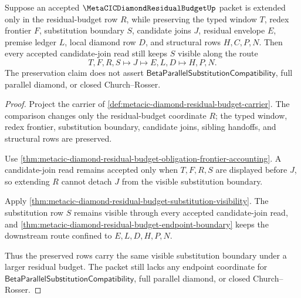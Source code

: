 \begin{theorem}
\label{thm:metacic-diamond-residual-budget-substitution-preservation}
Suppose an accepted $\MetaCICDiamondResidualBudgetUp$ packet is extended only in the residual-budget row $R$, while preserving the typed window $T$, redex frontier $F$, substitution boundary $S$, candidate joins $J$, residual envelope $E$, premise ledger $L$, local diamond row $D$, and structural rows $H,C,P,N$. Then every accepted candidate-join read still keeps $S$ visible along the route
$$
T,F,R,S \longmapsto J \longmapsto E,L,D \longmapsto H,P,N .
$$
The preservation claim does not assert $\mathsf{BetaParallelSubstitutionCompatibility}$, full parallel diamond, or closed Church--Rosser.
\end{theorem}
\begin{proof}
Project the carrier of \autoref{def:metacic-diamond-residual-budget-carrier}. The comparison changes only the residual-budget coordinate $R$; the typed window, redex frontier, substitution boundary, candidate joins, sibling handoffs, and structural rows are preserved.

Use \autoref{thm:metacic-diamond-residual-budget-obligation-frontier-accounting}. A candidate-join read remains accepted only when $T,F,R,S$ are displayed before $J$, so extending $R$ cannot detach $J$ from the visible substitution boundary.

Apply \autoref{thm:metacic-diamond-residual-budget-substitution-visibility}. The substitution row $S$ remains visible through every accepted candidate-join read, and \autoref{thm:metacic-diamond-residual-budget-endpoint-boundary} keeps the downstream route confined to $E,L,D,H,P,N$.

Thus the preserved rows carry the same visible substitution boundary under a larger residual budget. The packet still lacks any endpoint coordinate for $\mathsf{BetaParallelSubstitutionCompatibility}$, full parallel diamond, or closed Church--Rosser.
\end{proof}

